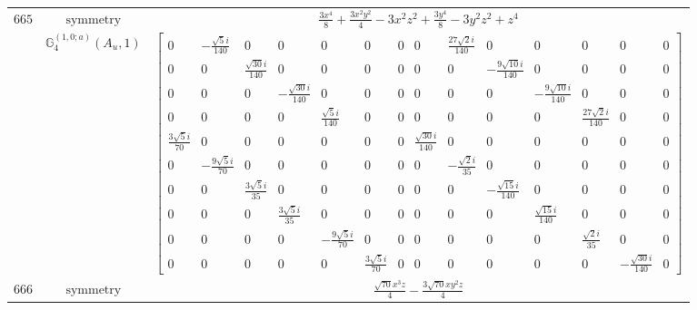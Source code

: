 \documentclass[fleqn,8pt,landscape]{jsarticle}
\begin{document}
\begin{longtable}{ccc}
$ 665 $ & $ \text{symmetry} $ & $ \frac{3 x^{4}}{8} + \frac{3 x^{2} y^{2}}{4} - 3 x^{2} z^{2} + \frac{3 y^{4}}{8} - 3 y^{2} z^{2} + z^{4} $ \\
$  $ & $ \mathbb{G}_{4}^{(1,0;a)}(A_{u},1) $ & $ \begin{bmatrix} 0 & - \frac{\sqrt{5} i}{140} & 0 & 0 & 0 & 0 & 0 & 0 & \frac{27 \sqrt{2} i}{140} & 0 & 0 & 0 & 0 & 0 \\ 0 & 0 & \frac{\sqrt{30} i}{140} & 0 & 0 & 0 & 0 & 0 & 0 & - \frac{9 \sqrt{10} i}{140} & 0 & 0 & 0 & 0 \\ 0 & 0 & 0 & - \frac{\sqrt{30} i}{140} & 0 & 0 & 0 & 0 & 0 & 0 & - \frac{9 \sqrt{10} i}{140} & 0 & 0 & 0 \\ 0 & 0 & 0 & 0 & \frac{\sqrt{5} i}{140} & 0 & 0 & 0 & 0 & 0 & 0 & \frac{27 \sqrt{2} i}{140} & 0 & 0 \\ \frac{3 \sqrt{5} i}{70} & 0 & 0 & 0 & 0 & 0 & 0 & \frac{\sqrt{30} i}{140} & 0 & 0 & 0 & 0 & 0 & 0 \\ 0 & - \frac{9 \sqrt{5} i}{70} & 0 & 0 & 0 & 0 & 0 & 0 & - \frac{\sqrt{2} i}{35} & 0 & 0 & 0 & 0 & 0 \\ 0 & 0 & \frac{3 \sqrt{5} i}{35} & 0 & 0 & 0 & 0 & 0 & 0 & - \frac{\sqrt{15} i}{140} & 0 & 0 & 0 & 0 \\ 0 & 0 & 0 & \frac{3 \sqrt{5} i}{35} & 0 & 0 & 0 & 0 & 0 & 0 & \frac{\sqrt{15} i}{140} & 0 & 0 & 0 \\ 0 & 0 & 0 & 0 & - \frac{9 \sqrt{5} i}{70} & 0 & 0 & 0 & 0 & 0 & 0 & \frac{\sqrt{2} i}{35} & 0 & 0 \\ 0 & 0 & 0 & 0 & 0 & \frac{3 \sqrt{5} i}{70} & 0 & 0 & 0 & 0 & 0 & 0 & - \frac{\sqrt{30} i}{140} & 0 \end{bmatrix} $ \\ \hline
$ 666 $ & $ \text{symmetry} $ & $ \frac{\sqrt{70} x^{3} z}{4} - \frac{3 \sqrt{70} x y^{2} z}{4} $ \\

\end{longtable}
\end{document}
